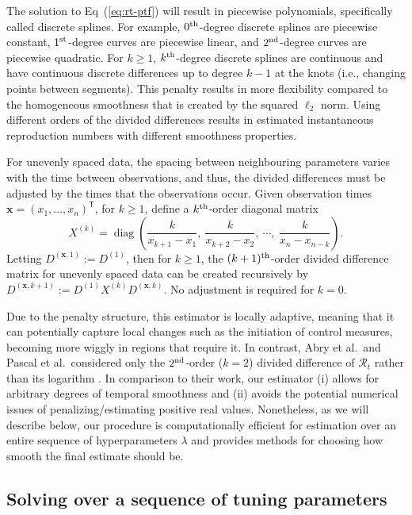 \documentclass[10pt,letterpaper]{article}
\newcommand{\lr}[1]{\left(#1\right)}
\DeclareMathOperator*{\diag}{diag}
\def\bfx{\mathbf{x}}
\def\calR{\mathcal{R}}
\renewcommand{\top}{\mathsf{T}}
\def\th{^{\textnormal{th}}}
\def\first{$1^{\textnormal{st}}$}
\def\second{$2^{\textnormal{nd}}$}
\renewcommand{\eqref}[1]{Eq~(\ref{#1})}
\begin{document}
The solution to \eqref{eq:rt-ptf} will result in piecewise
polynomials, specifically called discrete splines. For example, $0\th$-degree
discrete splines are piecewise constant, \first-degree curves are piecewise
linear, and \second-degree curves are piecewise quadratic. For $k\geq 1$,
$k\th$-degree discrete splines are continuous and have continuous discrete
differences up to degree $k-1$ at the knots (i.e., changing points between segments). This penalty results in more
flexibility compared to the homogeneous smoothness that is created by the
squared $\ell_2$ norm. Using different orders of the divided differences results in
estimated instantaneous reproduction numbers with different smoothness properties. 



For unevenly spaced data, the spacing between neighbouring parameters
varies with the time between observations, and thus, the divided differences
must be adjusted by the times that the observations occur. Given observation
times $\bfx = {(x_1,\dots,x_n)}^\top$, for $k \geq 1$, define a $k\th$-order
diagonal matrix 
\begin{equation}
  X^{(k)} = \diag \lr{\frac{k}{x_{k+1} - x_1},\ \frac{k}{x_{k+2} - x_2},\ 
  \cdots,\ \frac{k}{x_n - x_{n-k}} }.
\end{equation}
Letting $D^{(\bfx,1)} := D^{(1)}$,
then for $k\geq 1$, the $(k+1)\th$-order divided difference matrix for unevenly
spaced data can be created recursively by
$D^{(\bfx, k+1)} := D^{(1)} X^{(k)} D^{(\bfx,k)}.$ No adjustment is required
for $k=0$. 


Due to the penalty structure, this estimator is locally adaptive, meaning that
it can potentially capture local changes such as the initiation of control
measures, becoming more wiggly in regions that require it. In contrast, Abry et
al.\ and Pascal et al.\ considered only the \second-order ($k = 2$) divided
difference of $\calR_t$ rather than its logarithm
\cite{abry2020spatial,pascal2022nonsmooth}. In comparison to their work, our
estimator (i) allows for arbitrary degrees of temporal smoothness and (ii)
avoids the potential numerical issues of penalizing/estimating positive real
values. Nonetheless, as we will describe below, our procedure is computationally
efficient for estimation over an entire sequence of hyperparameters $\lambda$
and provides methods for choosing how smooth the final estimate should be.


\subsection{Solving over a sequence of tuning parameters}
\label{sec:candidate-set}
\end{document}
